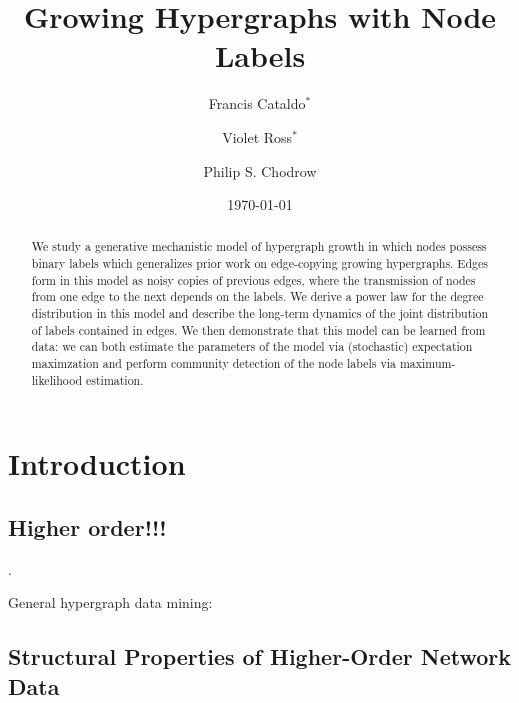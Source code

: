 \documentclass[aps,pre,reprint,superscriptaddress,nofootinbib]{revtex4-2}
\begin{document}
\title{Growing Hypergraphs with Node Labels}
\author{Francis Cataldo$^*$}
\author{Violet Ross$^*$}
\author{Philip S. Chodrow}


\date{\today}
\begin{abstract}
    We study a generative mechanistic model of hypergraph growth in which nodes possess binary labels which generalizes prior work on edge-copying growing hypergraphs.  
    Edges form in this model as noisy copies of previous edges, where the transmission of nodes from one edge to the next depends on the labels. 
    We derive a power law for the degree distribution in this model and describe the long-term dynamics of the joint distribution of labels contained in edges. 
    We then demonstrate that this model can be learned from data: we can both estimate the parameters of the model via (stochastic) expectation maximzation and perform community detection of the node labels via maximum-likelihood estimation. 
\end{abstract}

\maketitle

\def\thefootnote{*}\def\thefootnote{\arabic{footnote}}




\section{Introduction}
    
\subsection{Higher order!!!}

\cite{torresWhyHowWhen2021,battiston2021physics,battistonNetworksPairwiseInteractions2020}. 

General hypergraph data mining: 

\cite{leeSurveyHypergraphMining2025}


\subsection{Structural Properties of Higher-Order Network Data}
\end{document}

